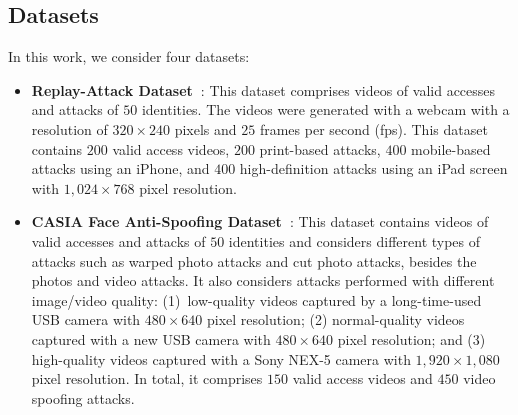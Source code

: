 \subsection{Datasets}
\label{subsec:Database}
In this work, we consider four datasets:
%
\begin{itemize}
\item \textbf{Replay-Attack Dataset~\cite{Chingovska:BIOSEG:2012}}: This dataset comprises videos of valid accesses and attacks of $50$ identities. The videos were generated with a webcam with a resolution of $320 \times 240$ pixels and $25$ frames per second (fps). {This dataset contains $200$ valid access videos, $200$ print-based attacks, $400$ mobile-based attacks using an iPhone, and $400$ high-definition attacks using an iPad screen with $1,024 \times 768$ pixel resolution.}

\item \textbf{CASIA Face Anti-Spoofing Dataset~\cite{Zhang:ICB:2012}}: This dataset contains videos of valid accesses and attacks of $50$ identities and considers different types of attacks such as warped photo attacks and cut photo attacks, besides the photos and video attacks. It also considers attacks performed with different image/video quality: 
{(1)~low-quality videos captured by a long-time-used USB camera with $480 \times 640$ pixel resolution; (2) normal-quality videos captured with a new USB camera with $480 \times 640$ pixel resolution; and (3) high-quality videos captured with a Sony NEX-5 camera with $1,920 \times 1,080$ pixel resolution.} In total, it comprises $150$ valid access videos and $450$ video spoofing attacks.


\end{itemize}
